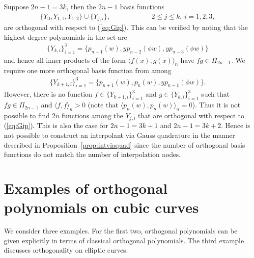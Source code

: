 \documentclass{amsart}
\theoremstyle{remark}
\def\la{{\langle}}
\def\ra{{\rangle}}
\def\la{{\langle}}
\def\ra{{\rangle}}
\begin{document}
Suppose $2n -1 = 3k$, then the $2n-1$ basis functions
\begin{align*}
\lbrace Y_{0}, Y_{1,1}, Y_{1,2}   \rbrace \cup  \lbrace Y_{j,i}  \rbrace,\qquad \qquad \qquad  2 \leq j \leq k,\: i= 1, 2, 3,
\end{align*}
are orthogonal with respect to (\ref{eq:Gip}). This can be verified by noting that the highest degree polynomials in the set are
\begin{align*}
\lbrace Y_{k,i}\rbrace_{i = 1}^{3} = \lbrace p_{n-1}(w), yp_{n-2}(\phi w), yp_{n-3}(\phi w) \rbrace
\end{align*}
and hence all inner products of the form $\la f(x), g(x) \ra_n$ have $fg \in \Pi_{2n-1}$. We require one more orthogonal basis function from among
\begin{align*}
\lbrace Y_{k+1,i}\rbrace_{i = 1}^{3} = \lbrace p_{n+1}(w), p_{n}(w), yp_{n-1}(\phi w) \rbrace.
\end{align*}
However, there is no function $f \in \lbrace Y_{k+1,i}\rbrace_{i = 1}^{3}$ and $g \in \lbrace Y_{k,i}\rbrace_{i = 1}^{3}$ such that $fg \in \Pi_{2n-1}$ and $\la f, f \ra_n >0$  (note that $\la p_n(w), p_n(w) \ra_n = 0$). Thus it is not possible to find $2n$ functions among the $Y_{j,i}$ that are orthogonal with respect to (\ref{eq:Gip}). This is also the case for $2n -1 = 3k + 1$ and $2n - 1 = 3k + 2$. Hence is not possible to construct an interpolant via Gauss quadrature in the manner described in Proposition~\ref{prop:intviaquad} since the number of orthogonal basis functions do not match the number of interpolation nodes. 



\section{Examples of orthogonal polynomials on cubic curves}
\setcounter{equation}{0}

We consider three examples. For the first two, orthogonal polynomials can be given explicitly in terms 
of classical orthogonal polynomials. The third example discusses orthogonality on elliptic curves. 
\end{document}
